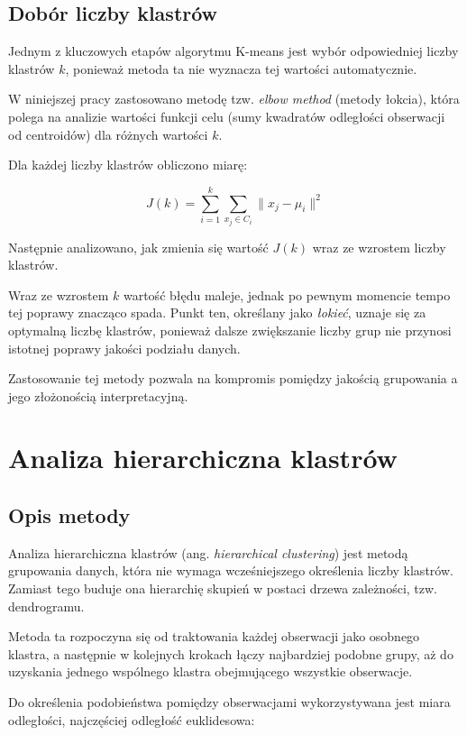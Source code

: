 \documentclass{report}
\begin{document}
\subsection{Dobór liczby klastrów}

Jednym z kluczowych etapów algorytmu K-means jest wybór odpowiedniej liczby klastrów \(k\), ponieważ metoda ta nie wyznacza tej wartości automatycznie.

W niniejszej pracy zastosowano metodę tzw. \textit{elbow method} (metody łokcia), która polega na analizie wartości funkcji celu (sumy kwadratów odległości obserwacji od centroidów) dla różnych wartości \(k\).

Dla każdej liczby klastrów obliczono miarę:

\[
J(k) = \sum_{i=1}^{k} \sum_{x_j \in C_i} \|x_j - \mu_i\|^2
\]

Następnie analizowano, jak zmienia się wartość \(J(k)\) wraz ze wzrostem liczby klastrów.

Wraz ze wzrostem \(k\) wartość błędu maleje, jednak po pewnym momencie tempo tej poprawy znacząco spada. Punkt ten, określany jako \textit{łokieć}, uznaje się za optymalną liczbę klastrów, ponieważ dalsze zwiększanie liczby grup nie przynosi istotnej poprawy jakości podziału danych.

Zastosowanie tej metody pozwala na kompromis pomiędzy jakością grupowania a jego złożonością interpretacyjną.

\section{Analiza hierarchiczna klastrów}

\subsection{Opis metody}

Analiza hierarchiczna klastrów (ang. \textit{hierarchical clustering}) jest metodą grupowania danych, która nie wymaga wcześniejszego określenia liczby klastrów. Zamiast tego buduje ona hierarchię skupień w postaci drzewa zależności, tzw. dendrogramu.

Metoda ta rozpoczyna się od traktowania każdej obserwacji jako osobnego klastra, a następnie w kolejnych krokach łączy najbardziej podobne grupy, aż do uzyskania jednego wspólnego klastra obejmującego wszystkie obserwacje.

Do określenia podobieństwa pomiędzy obserwacjami wykorzystywana jest miara odległości, najczęściej odległość euklidesowa:
\end{document}
